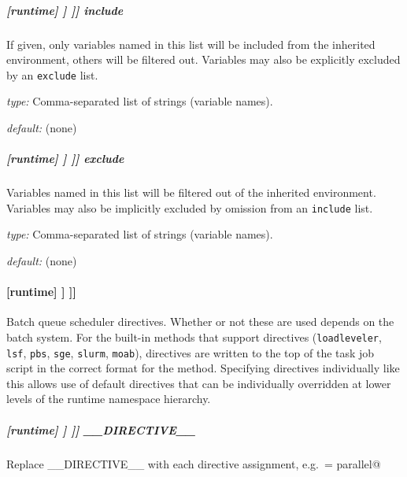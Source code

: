 \subparagraph[include]{[runtime] \textrightarrow [[\_\_NAME\_\_]] \textrightarrow [[[environment filter]]] \textrightarrow include}

If given, only variables named in this list will be included from the
inherited environment, others will be filtered out. Variables may also
be explicitly excluded by an \lstinline=exclude= list.

\begin{myitemize}
\item {\em type:} Comma-separated list of strings (variable names).
\item {\em default:} (none)
\end{myitemize}

\subparagraph[exclude]{[runtime] \textrightarrow [[\_\_NAME\_\_]] \textrightarrow [[[environment filter]]] \textrightarrow exclude}

Variables named in this list will be filtered out of the inherited
environment.  Variables may also be implicitly excluded by
omission from an \lstinline=include= list.

\begin{myitemize}
\item {\em type:} Comma-separated list of strings (variable names).
\item {\em default:} (none)
\end{myitemize}

\paragraph[{[[[}directives{]]]}]{[runtime] \textrightarrow [[\_\_NAME\_\_]] \textrightarrow [[[directives]]]}

Batch queue scheduler directives.  Whether or not these are used depends
on the batch system. For the built-in methods that support directives
(\lstinline=loadleveler=, \lstinline=lsf=, \lstinline=pbs=, \lstinline=sge=,
\lstinline=slurm=, \lstinline=moab=), directives are written to the top of the
task job script in the correct format for the method. Specifying directives
individually like this allows use of default directives that can be
individually overridden at lower levels of the runtime namespace hierarchy.

\subparagraph[\_\_DIRECTIVE\_\_ ]{[runtime] \textrightarrow [[\_\_NAME\_\_]] \textrightarrow [[[directives]]] \textrightarrow \_\_DIRECTIVE\_\_}

Replace \_\_DIRECTIVE\_\_ with each directive assignment, e.g.\ 
\lstinline@class = parallel@

